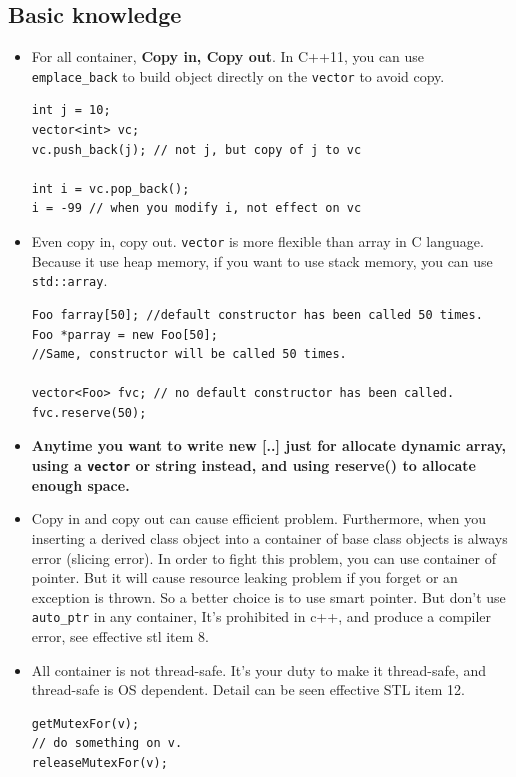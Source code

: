 \documentclass[a4paper,11pt,twoside]{book}
\begin{document}
\subsection{Basic knowledge}
\begin{itemize}

\item For all container, \textbf{Copy in, Copy out}. In C++11, you can use \texttt{emplace\_back} to build object directly on the \texttt{vector} to avoid copy.
\begin{lstlisting}[numbers=none]
int j = 10;
vector<int> vc;
vc.push_back(j); // not j, but copy of j to vc

int i = vc.pop_back(); 
i = -99 // when you modify i, not effect on vc
\end{lstlisting}

\item Even copy in, copy out. \texttt{vector} is more flexible than array in C language. Because it use heap memory, if you want to use stack memory, you can use \texttt{std::array}.
\begin{lstlisting}[numbers=none]
Foo farray[50]; //default constructor has been called 50 times.
Foo *parray = new Foo[50]; 
//Same, constructor will be called 50 times.

vector<Foo> fvc; // no default constructor has been called.
fvc.reserve(50);
\end{lstlisting}

\item \textbf{Anytime you want to write new [..] just for allocate dynamic array, using a \texttt{vector} or string instead, and using reserve() to allocate enough space.}


\item Copy in and copy out can cause efficient problem. Furthermore, when you inserting a derived class object into a container of base class objects is always error (slicing error). In order to fight this problem, you can use container of pointer. But it will cause resource leaking problem if you forget or an exception is thrown. So a better choice is to use smart pointer. But don't use \texttt{auto\_ptr} in any container, It's prohibited in c++, and produce a compiler error, see effective stl item 8.

\item All container is not thread-safe. It's your duty to make it thread-safe, and thread-safe is OS dependent. Detail can be seen effective STL item 12.
\begin{lstlisting}[numbers=none]
getMutexFor(v);
// do something on v.
releaseMutexFor(v);
\end{lstlisting}


\end{itemize}
\end{document}
